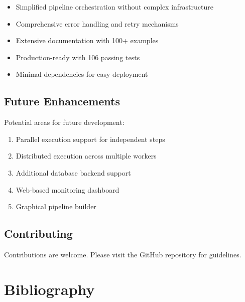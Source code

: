 \documentclass[12pt,a4paper]{report}
\begin{document}
\begin{itemize}
    \item Simplified pipeline orchestration without complex infrastructure
    \item Comprehensive error handling and retry mechanisms
    \item Extensive documentation with 100+ examples
    \item Production-ready with 106 passing tests
    \item Minimal dependencies for easy deployment
\end{itemize}

\section{Future Enhancements}

Potential areas for future development:

\begin{enumerate}
    \item Parallel execution support for independent steps
    \item Distributed execution across multiple workers
    \item Additional database backend support
    \item Web-based monitoring dashboard
    \item Graphical pipeline builder
\end{enumerate}

\section{Contributing}

Contributions are welcome. Please visit the GitHub repository for guidelines.

\chapter{Bibliography}
\cleardoublepage
\end{document}
